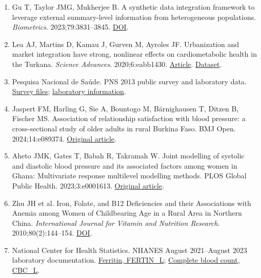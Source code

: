 \documentclass[sigconf,anonymous,nonacm]{acmart}
\begin{document}
\begin{enumerate}
\item Gu T, Taylor JMG, Mukherjee B. A synthetic data integration framework to leverage external summary-level information from heterogeneous populations. \emph{Biometrics}. 2023;79:3831–\allowbreak{}3845. \href{https://doi.org/10.1111/biom.13852}{DOI}.

\item Lea AJ, Martins D, Kamau J, Gurven M, Ayroles JF. Urbanization and market integration have strong, nonlinear effects on cardiometabolic health in the Turkana. \emph{Science Advances}. 2020;6:eabb1430. \href{https://doi.org/10.1126/sciadv.abb1430}{Article}. \href{https://doi.org/10.5061/dryad.2z34tmpjk}{Dataset}.

\item Pesquisa Nacional de Saúde. PNS 2013 public survey and laboratory data. \href{https://www.pns.icict.fiocruz.br/bases-de-dados/}{Survey files}; \href{https://www.pns.icict.fiocruz.br/exames-laboratoriais/}{laboratory information}.

\item Jaspert FM, Harling G, Sie A, Bountogo M, Bärnighausen T, Ditzen B, Fischer MS. Association of relationship satisfaction with blood pressure: a cross-sectional study of older adults in rural Burkina Faso. BMJ Open. 2024;14:e089374. \href{https://doi.org/10.1136/bmjopen-2024-089374}{Original article}.

\item Aheto JMK, Gates T, Babah R, Takramah W. Joint modelling of systolic and diastolic blood pressure and its associated factors among women in Ghana: Multivariate response multilevel modelling methods. PLOS Global Public Health. 2023;3:e0001613. \href{https://pmc.ncbi.nlm.nih.gov/articles/PMC10132648/}{Original article}.

\item Zhu JH et al. Iron, Folate, and B12 Deficiencies and their Associations with Anemia among Women of Childbearing Age in a Rural Area in Northern China. \emph{International Journal for Vitamin and Nutrition Research}. 2010;80(2):144–\allowbreak{}154. \href{https://doi.org/10.1024/0300-9831/a000014}{DOI}.

\item National Center for Health Statistics. NHANES August 2021–\allowbreak{}August 2023 laboratory documentation. \href{https://wwwn.cdc.gov/Nchs/Data/Nhanes/Public/2021/DataFiles/FERTIN\_L.htm}{Ferritin, FERTIN\_L}; \href{https://wwwn.cdc.gov/Nchs/Data/Nhanes/Public/2021/DataFiles/CBC\_L.htm}{Complete blood count, CBC\_L}.

\end{enumerate}
\end{document}
